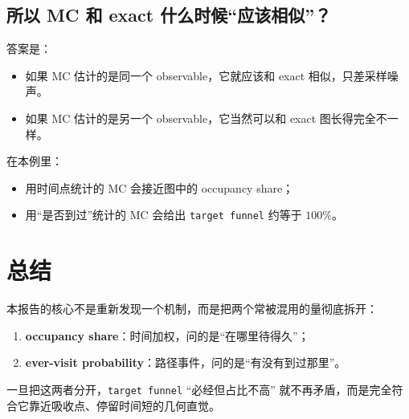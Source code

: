 \documentclass[11pt,fontset=fandol]{ctexart}
\begin{document}
\subsection{所以 MC 和 exact 什么时候“应该相似”？}
答案是：
\begin{itemize}
  \item 如果 MC 估计的是同一个 observable，它就应该和 exact 相似，只差采样噪声。
  \item 如果 MC 估计的是另一个 observable，它当然可以和 exact 图长得完全不一样。
\end{itemize}

在本例里：
\begin{itemize}
  \item 用时间点统计的 MC 会接近图中的 occupancy share；
  \item 用“是否到过”统计的 MC 会给出 \texttt{target funnel} 约等于 $100\%$。
\end{itemize}

\section*{总结}
本报告的核心不是重新发现一个机制，而是把两个常被混用的量彻底拆开：
\begin{enumerate}
  \item \textbf{occupancy share}：时间加权，问的是“在哪里待得久”；
  \item \textbf{ever-visit probability}：路径事件，问的是“有没有到过那里”。
\end{enumerate}
一旦把这两者分开，\texttt{target funnel} “必经但占比不高” 就不再矛盾，而是完全符合它靠近吸收点、停留时间短的几何直觉。
\end{document}

